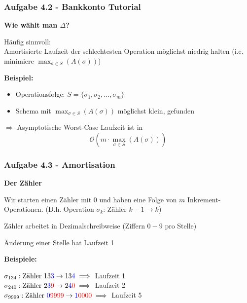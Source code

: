 \documentclass{beamer}
\begin{document}
\begin{frame}[t]
	\frametitle{Aufgabe 4.2 - Bankkonto Tutorial}

	\textbf{Wie wählt man $\Delta$?}

	\medskip

	Häufig sinnvoll: \\
	Amortisierte Laufzeit der schlechtesten Operation möglichst niedrig halten
	(i.e. minimiere $\max_{\sigma \in S}(A(\sigma))$)

	\bigskip

	\textbf{Beispiel:}

	\begin{itemize}
		\item Operationsfolge: $S = \{ \sigma_1, \sigma_2, \dots, \sigma_m \}$
		\item Schema mit $\max_{\sigma \in S}(A(\sigma))$ möglichst klein, gefunden
	\end{itemize}

	\medskip

	$\Rightarrow$ Asymptotische Worst-Case Laufzeit ist in
	$$\mathcal{O}(m \cdot \max_{\sigma \in S}(A(\sigma)))$$

\end{frame}

\begin{frame}
	\frametitle{Aufgabe 4.3 - Amortisation}

	\textbf{Der Zähler}

	\medskip

	Wir starten einen Zähler mit $0$ und haben eine Folge von $m$ Inkrement-Operationen.
	(D.h. Operation $\sigma_k$: Zähler $k-1 \rightarrow k$)

	\medskip

	Zähler arbeitet in Dezimalschreibweise (Ziffern $0-9$ pro Stelle)

	\medskip

	Änderung einer Stelle hat Laufzeit 1

	\bigskip

	\textbf{Beispiele:}

	\medskip

	$\sigma_{134}: \text{Zähler } 13\mathcolor{blue}{3} \rightarrow 13\mathcolor{blue}{4} \implies$ Laufzeit 1 \\
	$\sigma_{240}: \text{Zähler } 2\mathcolor{blue}{3}\mathcolor{red}{9} \rightarrow 2\mathcolor{blue}{4}\mathcolor{red}{0} \implies$ Laufzeit 2 \\
	$\sigma_{9999}: \text{Zähler } \mathcolor{blue}{0}\mathcolor{red}{9999} \rightarrow \mathcolor{blue}{1}\mathcolor{red}{0000} \implies$ Laufzeit 5
\end{frame}
\end{document}
